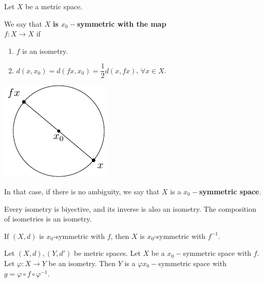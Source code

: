 \documentclass{amsart}
\begin{document}
\begin{definition}
	Let \(X\) be a metric space. \\
	\begin{minipage}{0.7\linewidth}
		We say that \(X\) \textbf{is \(x_0-\)symmetric with the map \\\(f:X \longrightarrow X\)} if
		\begin{enumerate}
			\item \(f\) is an isometry.
			\item \(d(x,x_0) = d(fx,x_0) = \dfrac{1}{2} d(x,fx)\), \(\forall x \in X\).
		\end{enumerate}
	\end{minipage}
	\begin{minipage}{0.3\linewidth}
		\includegraphics[width= 0.9 \linewidth, page = 1]{IMAGENES/1/tikz.pdf}
	\end{minipage}
	In that case, if there is no ambiguity, we say that \(X\) is a \textbf{\(x_0-\)symmetric space}.
\end{definition}
Every isometry is biyective, and its inverse is also an isometry.
The composition of isometries is an isometry.
\begin{theorem}
	If \((X,d)\) is \(x_0\)-symmetric with \(f\), then \(X\) is \(x_0\)-symmetric with \(f^{-1}\).
\end{theorem}
\begin{theorem}
	Let \((X,d), (Y,d')\) be metric spaces.
	Let \(X\) be a \(x_0-\)symmetric space with \(f\).
	Let \(\varphi :X \longrightarrow Y\) be an isometry.
	Then \(Y\) is a \(\varphi x_0-\)symmetric space with \(g = \varphi \circ f \circ \varphi ^{-1}\).
\end{theorem}
\end{document}
